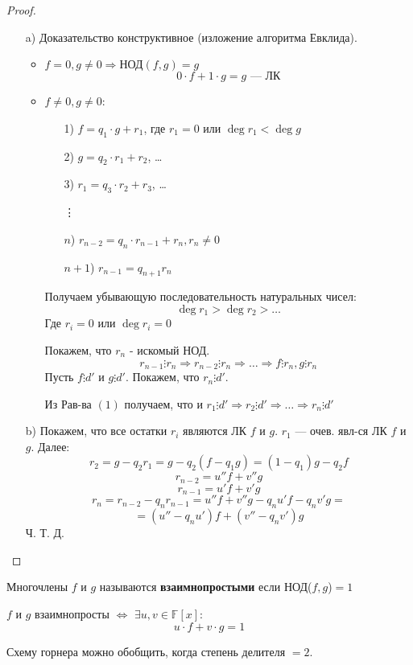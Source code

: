 \begin{proof}
  \begin{itemize}
    \item [a) ] Доказательство конструктивное (изложение алгоритма Евклида).
      \begin{itemize}
        \item $f = 0, g \neq 0 \Rightarrow \text{НОД}(f, g) = g$
         \[
         0 \cdot f + 1 \cdot g = g \text{ --- ЛК}
         \] 
       \item $f \neq 0, g \neq 0$:
         \begin{enumerate}
           \item [1) ] $f = q_1 \cdot g + r_1$, где $r_1 = 0$ или $\deg r_1 < \deg g$
           \item [2) ] $g = q_2 \cdot r_1 + r_2$, \ldots
           \item [3) ] $r_1 = q_3 \cdot r_2 + r_3$, \ldots

             \vdots

            \item [$n$) ] $r_{n - 2} = q_n \cdot r_{n - 1} + r_n, r_n \neq 0$
            \item [$n + 1$)] $r_{n - 1} = q_{n + 1} r_n$
         \end{enumerate}
         Получаем убывающую последовательность натуральных чисел:
         \[
         \deg r_1 > \deg r_2 > \ldots
         \]
         Где $r_i = 0$ или $\deg r_i = 0$
         
         Покажем, что $r_n$ - искомый НОД.
         \[
         r_{n-1} \vdots r_n \Rightarrow r_{n - 2} \vdots r_n \Rightarrow \ldots \Rightarrow f \vdots r_n, g \vdots r_n
         \]
         Пусть $f \vdots d'$ и $g \vdots d'$. Покажем, что $r_n \vdots d'$.

         Из Рав-ва $(1)$ получаем, что и $r_1 \vdots d' \Rightarrow r_2 \vdots d' \Rightarrow \ldots \Rightarrow r_n \vdots d'$ 
      \end{itemize}
    \item [b) ] Покажем, что все остатки $r_i$ являются ЛК $f$ и $g$. $r_1$ --- очев. явл-ся ЛК $f$ и $g$. Далее: 
      \[
      r_2 = g - q_2 r_1 = g - q_2 (f - q_1 g) = (1 - q_1) g - q_2 f
      \]
      \[
      r_{n - 2} = u'' f + v'' g
      \]
      \[
      r_{n - 1}= u' f + v' g
      \]
      \[
      r_n = r_{n - 2} - q_{n} r_{n - 1} = u'' f + v'' g - q_n u' f - q_n v' g = 
      \]
      \[
       = (u'' - q_n u') f + (v'' - q_n v') g
      \]
      Ч. Т. Д.
  \end{itemize}
\end{proof}
\begin{definition}
Многочлены $f$ и $g$ называются \textbf{взаимнопростыми} если НОД($f, g$)$ = 1$ 
\end{definition}
\begin{note}
$f$ и $g$ взаимнопросты $\iff$ $\exists u, v \in \mathbb{F}[x]\colon$
\[
u \cdot f + v \cdot g = 1
\]
\end{note}
\begin{note}
Схему горнера можно обобщить, когда степень делителя $= 2$.
\end{note}
